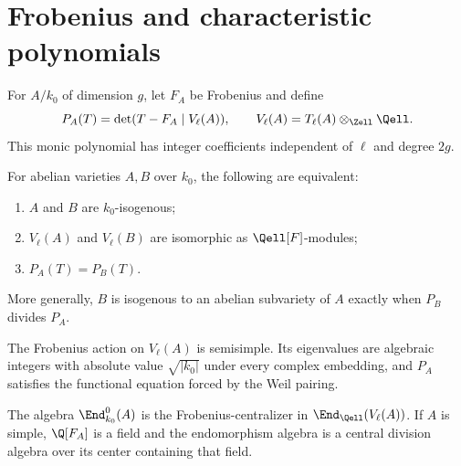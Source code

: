 \section{Frobenius and characteristic polynomials}
\label{mumford-AppI-frobenius}

\begin{definition}
\label{mumford-def-frobenius-polynomial}
For $A/k_0$ of dimension $g$, let $F_A$ be Frobenius and define
\[
 P_A(T)=\det(T-F_A\mid V_\ell(A)),\qquad
 V_\ell(A)=T_\ell(A)\otimes_{\Zell}\Qell.
\]
This monic polynomial has integer coefficients independent of $\ell$ and degree
$2g$.
\notready
\end{definition}

\begin{theorem}
\label{mumford-thm-frobenius-isogeny-criterion}
For abelian varieties $A,B$ over $k_0$, the following are equivalent:
\begin{enumerate}
\item $A$ and $B$ are $k_0$-isogenous;
\item $V_\ell(A)$ and $V_\ell(B)$ are isomorphic as $\Qell[F]$-modules;
\item $P_A(T)=P_B(T)$.
\end{enumerate}
More generally, $B$ is isogenous to an abelian subvariety of $A$ exactly when
$P_B$ divides $P_A$.
\notready
\end{theorem}

\begin{theorem}
\label{mumford-thm-frobenius-semisimple}
The Frobenius action on $V_\ell(A)$ is semisimple.  Its eigenvalues are
algebraic integers with absolute value $\sqrt{|k_0|}$ under every complex
embedding, and $P_A$ satisfies the functional equation forced by the Weil
pairing.
\notready
\end{theorem}

\begin{corollary}
\label{mumford-cor-finite-field-end-algebra}
The algebra $\End^0_{k_0}(A)$ is the Frobenius-centralizer in
$\End_{\Qell}(V_\ell(A))$.  If $A$ is simple, $\Q[F_A]$ is a field and the
endomorphism algebra is a central division algebra over its center containing
that field.
\notready
\end{corollary}

